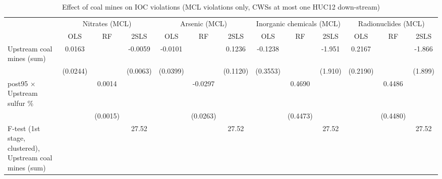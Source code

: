 
\begin{table}[htbp]
   
   \caption{\label{2sls_dwnstrm_minevio_mcl_ivsum} Effect of coal mines on IOC violations (MCL violations only, CWSs at most one HUC12 down-stream)}
   \bigskip
   
   \centering
   
   \begin{adjustbox}{width = \textwidth, center}
      
      
      \begin{tabular}{lcccccccccccc}
         \toprule
         
          & \multicolumn{3}{c}{Nitrates (MCL)} & \multicolumn{3}{c}{Arsenic (MCL)} & \multicolumn{3}{c}{Inorganic chemicals (MCL)} & \multicolumn{3}{c}{Radionuclides (MCL)}\\
         
                                                                  & OLS           & RF            & 2SLS          & OLS           & RF            & 2SLS          & OLS           & RF            & 2SLS          & OLS           & RF            & 2SLS\\  
         
         \midrule 
         Upstream coal mines (sum)                                & 0.0163        &               & -0.0059       & -0.0101       &               & 0.1236        & -0.1238       &               & -1.951        & 0.2167        &               & -1.866\\   
                                                                  & (0.0244)      &               & (0.0063)      & (0.0399)      &               & (0.1120)      & (0.3553)      &               & (1.910)       & (0.2190)      &               & (1.899)\\   
         post95 $\times$ Upstream sulfur \%                       &               & 0.0014        &               &               & -0.0297       &               &               & 0.4690        &               &               & 0.4486        &   \\   
                                                                  &               & (0.0015)      &               &               & (0.0263)      &               &               & (0.4473)      &               &               & (0.4480)      &   \\   
         
         F-test (1st stage, clustered), Upstream coal mines (sum) &               &               & 27.52         &               &               & 27.52         &               &               & 27.52         &               &               & 27.52\\  
         

\end{tabular}
\end{adjustbox}
\end{table}
